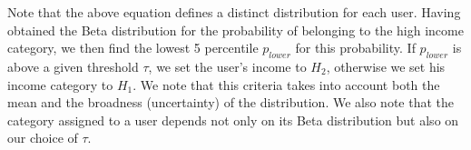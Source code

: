 Note that the above equation defines a distinct distribution for each user. Having obtained the Beta distribution for the probability of belonging to the high income category, we then find the lowest 5 percentile $p_{lower}$ for this probability. If $p_{lower}$ is above a given threshold $\tau$, we set the user's income to $H_2$, otherwise we set his income category to $H_1$. We note that this criteria takes into account both the mean and the broadness (uncertainty) of the distribution. We also note that the category assigned to a user depends not only on its Beta distribution but also on our choice of $\tau$.









